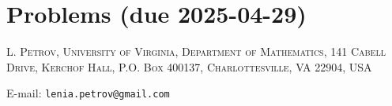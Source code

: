 \documentclass[letterpaper,11pt,oneside,reqno]{article}
\numberwithin{equation}{section}
\theoremstyle{definition}
\begin{document}
\appendix
\setcounter{section}{12}

\section{Problems (due 2025-04-29)}









\medskip

\textsc{L. Petrov, University of Virginia, Department of Mathematics, 141 Cabell Drive, Kerchof Hall, P.O. Box 400137, Charlottesville, VA 22904, USA}

E-mail: \texttt{lenia.petrov@gmail.com}
\end{document}
